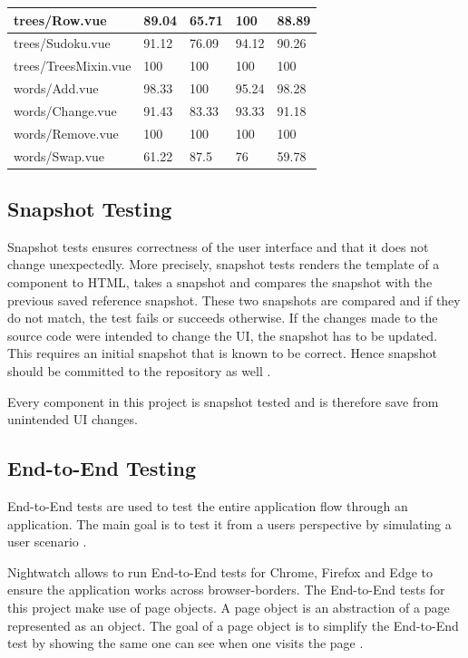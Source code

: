 \begin{table}
\begin{tabular}{|l|l|l|l|l|}
        trees/Row.vue & 89.04 & 65.71 & 100 & 88.89 \\ \hline
        trees/Sudoku.vue & 91.12 & 76.09 & 94.12 & 90.26 \\ \hline
        trees/TreesMixin.vue & 100 & 100 & 100 & 100 \\ \hline
        words/Add.vue & 98.33 & 100 & 95.24 & 98.28 \\ \hline
        words/Change.vue & 91.43 & 83.33 & 93.33 & 91.18 \\ \hline
        words/Remove.vue & 100 & 100 & 100 & 100 \\ \hline
        words/Swap.vue & 61.22 & 87.5 & 76 & 59.78 \\ \hline
    \end{tabular}
\end{table}

\subsection{Snapshot Testing}
\label{subsection:snapshotTesting}
Snapshot tests ensures correctness of the user interface and that it does not change unexpectedly. More precisely, snapshot tests renders the template of a component to HTML, takes a snapshot and compares the snapshot with the previous saved reference snapshot. These two snapshots are compared and if they do not match, the test fails or succeeds otherwise. If the changes made to the source code were intended to change the UI, the snapshot has to be updated. This requires an initial snapshot that is known to be correct. Hence snapshot should be committed to the repository as well \cite{Jest}.

Every component in this project is snapshot tested and is therefore save from unintended UI changes.

\subsection{End-to-End Testing}
\label{subsection:e2e}
End-to-End tests are used to test the entire application flow through an application. The main goal is to test it from a users perspective by simulating a user scenario \cite{EndToEndTests}. 

Nightwatch allows to run End-to-End tests for Chrome, Firefox and Edge to ensure the application works across browser-borders. The End-to-End tests for this project make use of page objects. A page object is an abstraction of a page represented as an object. The goal of a page object is to simplify the End-to-End test by showing the same one can see when one visits the page \cite{Nightwatch}.

